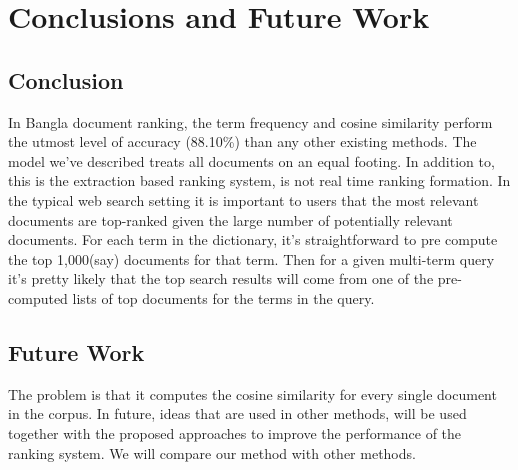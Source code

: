 \chapter{Conclusions and Future Work}
\label{Ch_Conclusion}

\section{Conclusion}

In Bangla document ranking, the term frequency and cosine similarity perform the utmost level of accuracy (88.10\%) than any other existing methods. The model we’ve described treats all documents on an equal footing. In addition to, this is the extraction based ranking system, is not real time ranking formation. In the typical web search setting it is important to users that the most relevant documents are top-ranked given the large number of potentially relevant documents. For each term in the dictionary, it’s straightforward to pre compute the top 1,000(say) documents for that term. Then for a given multi-term query it’s pretty likely that the top search results will come from one of the pre-computed lists of top documents for the terms in the query.

\section{Future Work}

The problem is that it computes the cosine similarity for every single document in the corpus. In future, ideas that are used in other methods, will be used together with the proposed approaches to improve the performance of the ranking system. We will compare our method with other methods.